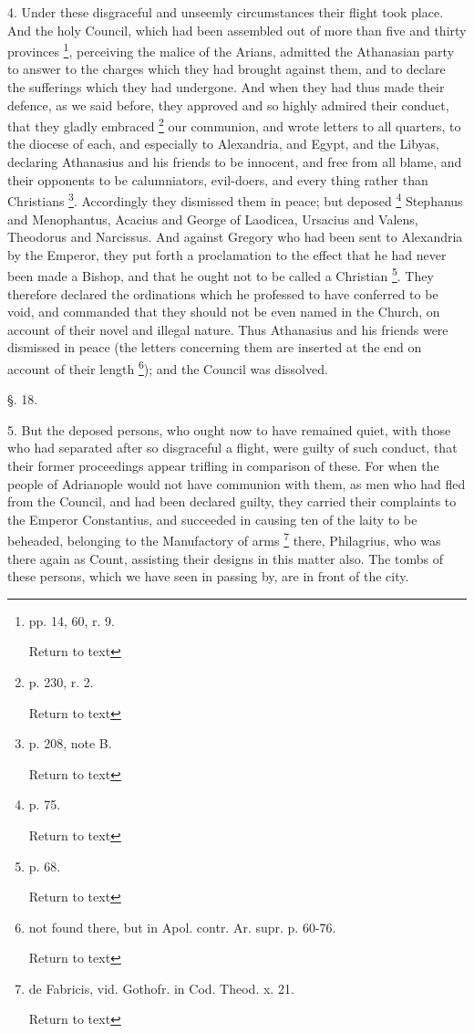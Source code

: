 4. Under these disgraceful and unseemly
circumstances their flight took place. And the holy Council, which had
been assembled out of more than five and thirty provinces \footnote{pp. 14, 60, r. 9.

Return to text}, perceiving the malice of the Arians, admitted the Athanasian
party to answer to the charges which they had brought against them,
and to declare the sufferings which they had undergone. And when they
had thus made their defence, as we said before, they approved and so
highly admired their conduct, that they gladly embraced \footnote{p. 230, r. 2.

Return to text} our communion, and wrote letters to all quarters, to the
diocese of each, and especially to Alexandria, and Egypt, and the
Libyas, declaring Athanasius and his friends to be innocent, and free
from all blame, and their opponents to be calumniators, evil-doers,
and every thing rather than Christians \footnote{p. 208, note B.

Return to text}. Accordingly they dismissed them in peace; but deposed \footnote{p. 75.

Return to text} Stephanus and Menophantus, Acacius and George of Laodicea,
Ursacius and Valens, Theodorus and Narcissus. And against
Gregory who had been sent to Alexandria by the Emperor, they put forth
a proclamation to the effect that he had never been made a Bishop, and
that he ought not to be called a Christian \footnote{p. 68.

Return to text}. They therefore declared the ordinations which he professed to
have conferred to be void, and commanded that they should not be even
named in the Church, on account of their novel and illegal nature.
Thus Athanasius and his friends were dismissed in peace (the letters
concerning them are inserted at the end on account of their length \footnote{not found there, but in Apol. contr. Ar. supr. p. 60-76.

Return to text}); and the Council was dissolved.

§. 18.

5. But the deposed persons, who ought now to have
remained quiet, with those who had separated after so disgraceful a
flight, were guilty of such conduct, that their former proceedings
appear trifling in comparison of these. For when the people of
Adrianople would not have communion with them, as men who had fled
from the Council, and had been declared guilty, they carried their
complaints to the Emperor Constantius, and succeeded in causing ten of
the laity to be beheaded, belonging to the Manufactory of arms \footnote{de Fabricis, vid. Gothofr. in Cod. Theod. x. 21.

Return to text} there, Philagrius, who was there again as Count, assisting
their designs in this matter also. The tombs of these persons, which
we have seen in passing by, are in front of the city.

